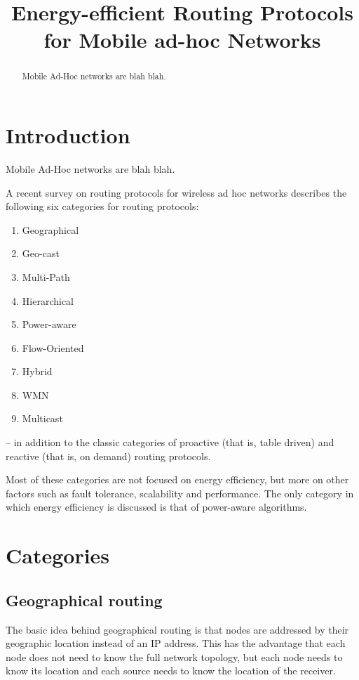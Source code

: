 \documentclass[conference]{IEEEtran}
\begin{document}
\title{Energy-efficient Routing Protocols for Mobile ad-hoc Networks}
\author{
}

\maketitle


\begin{abstract}
Mobile Ad-Hoc networks are blah blah.
\end{abstract}


\section{Introduction}
Mobile Ad-Hoc networks are blah blah.

A recent survey\cite{alotaibi2012survey} on routing protocols for wireless
ad hoc networks describes the following six categories for routing protocols:
\begin{enumerate}
  \item Geographical
  \item Geo-cast
  \item Multi-Path
  \item Hierarchical
  \item Power-aware
  \item Flow-Oriented
  \item Hybrid
  \item WMN
  \item Multicast
\end{enumerate}
-- in addition to the classic categories of proactive (that is, table driven)
and reactive (that is, on demand) routing protocols.

Most of these categories are not focused on energy efficiency, but more on
other factors such as fault tolerance, scalability and performance. The only
category in which energy efficiency is discussed is that of power-aware algorithms.


\section{Categories}
\subsection{Geographical routing}
The basic idea behind geographical routing is that nodes are addressed by
their geographic location instead of an IP address. This has the advantage
that each node does not need to know the full network topology, but each
node needs to know its location and each source needs to know the location
of the receiver.
\end{document}

